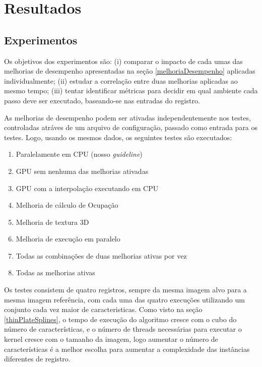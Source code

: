 \chapter{Resultados}
\label{cap:resultados}

\section{Experimentos}
  Os objetivos dos experimentos são: (i) comparar o impacto de cada umas das
melhorias de desempenho apresentadas na seção \ref{melhoriaDesempenho} aplicadas
individualmente; (ii) estudar a correlação entre duas melhorias aplicadas ao
mesmo tempo; (iii) tentar identificar métricas para decidir em qual ambiente
cada passo deve ser executado, baseando-se nas entradas do registro.

  As melhorias de desempenho podem ser ativadas independentemente nos testes,
controladas atráves de um arquivo de configuração, passado como entrada para os
testes. Logo, usando os mesmos dados, os seguintes testes são executados:

\begin{enumerate}
  \item Paralelamente em CPU (nosso \textit{guideline})
  \item GPU sem nenhuma das melhorias ativadas
  \item GPU com a interpolação executando em CPU
  \item Melhoria de cálculo de Ocupação
  \item Melhoria de textura 3D
  \item Melhoria de execução em paralelo
  \item Todas as combinações de duas melhorias ativas por vez
  \item Todas as melhorias ativas
\end{enumerate}

  Os testes consistem de quatro registros, sempre da mesma imagem alvo para a
mesma imagem referência, com cada uma das quatro execuções utilizando um
conjunto cada vez maior de caracteristicas. Como visto na seção
\ref{thinPlateSplines}, o tempo de execução do algoritmo cresce com o cubo do
número de características, e o número de threads necessárias para executar o
kernel cresce com o tamanho da imagem, logo aumentar o número de características
é a melhor escolha para aumentar a complexidade das instâncias diferentes de
registro.

